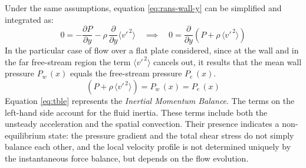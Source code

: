 \documentclass[12pt, a4paper, twoside, openright]{book}
\begin{document}
Under the same assumptions, equation \eqref{eq:rans-wall-y} can be simplified and integrated  as:
\begin{equation}
	0 =
	- \frac{\partial P}{\partial y}
	- \rho \, \frac{\partial}{\partial y} \langle v'^{\, 2} \rangle
	\quad
	\implies
	\quad
	0 =
	\frac{\partial}{\partial y} \left(
	P + \rho \, \langle v'^{\, 2} \rangle \right)
	\label{eq:pressure-tble}
\end{equation}
In the particular case of flow over a flat plate considered, since at the wall and in the far free-stream region the term $\langle v'^{\, 2} \rangle$ cancels out, it results that the mean wall pressure $P_w \, (x)$ equals the free-stream pressure $P_e \, (x)$.
\begin{equation}
	\left(
	P + \rho \, \langle v'^{\, 2} \rangle \right) = P_w \, (x) = P_e \, (x)
\end{equation}
Equation \eqref{eq:tble} represents the \textit{Inertial Momentum Balance}. The terms on the left-hand side account for the fluid inertia. These terms include both the unsteady acceleration and the spatial convection.
Their presence indicates a non-equilibrium state: the pressure gradient and the total shear stress do not simply balance each other, and the local velocity profile is not determined uniquely by the instantaneous force balance, but depends on the flow evolution.
\end{document}
